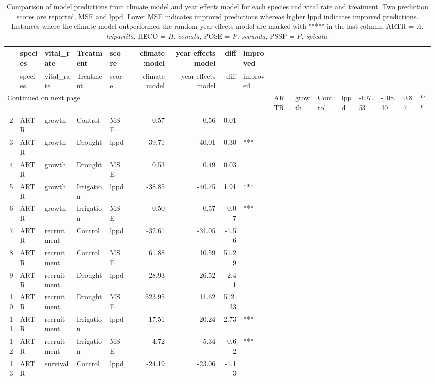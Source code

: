 \begin{longtable}{rllllrrrl}
\caption{Comparison of model predictions from climate model and year effects model for each species and vital rate and treatment.  Two prediction scores are reported, MSE and lppd. Lower MSE indicates improved predictions whereas higher lppd indicates improved predictions.  Instances where the climate model outperformed the random year effects model are marked with "***" in the last column. ARTR = \textit{A. tripartita}, HECO = \textit{H. comata}, POSE = \textit{P. secunda}, PSSP = \textit{P. spicata}.} \\ 
  \hline
 & species & vital\_rate & Treatment & score & climate model & year effects model & diff & improved \\ 
  \hline
\endfirsthead
  \hline
& species & vital\_rate & Treatment & score & climate model & year effects model & diff & improved \\ 
\hline
\endhead
\hline
\multicolumn{9}{l}{\footnotesize Continued on next page}
\endfoot
\endlastfoot
1 & ARTR & growth & Control & lppd & -107.53 & -108.40 & 0.87 & *** \\ 
  2 & ARTR & growth & Control & MSE & 0.57 & 0.56 & 0.01 &  \\ 
  3 & ARTR & growth & Drought & lppd & -39.71 & -40.01 & 0.30 & *** \\ 
  4 & ARTR & growth & Drought & MSE & 0.53 & 0.49 & 0.03 &  \\ 
  5 & ARTR & growth & Irrigation & lppd & -38.85 & -40.75 & 1.91 & *** \\ 
  6 & ARTR & growth & Irrigation & MSE & 0.50 & 0.57 & -0.07 & *** \\ 
  7 & ARTR & recruitment & Control & lppd & -32.61 & -31.05 & -1.56 &  \\ 
  8 & ARTR & recruitment & Control & MSE & 61.88 & 10.59 & 51.29 &  \\ 
  9 & ARTR & recruitment & Drought & lppd & -28.93 & -26.52 & -2.41 &  \\ 
  10 & ARTR & recruitment & Drought & MSE & 523.95 & 11.62 & 512.33 &  \\ 
  11 & ARTR & recruitment & Irrigation & lppd & -17.51 & -20.24 & 2.73 & *** \\ 
  12 & ARTR & recruitment & Irrigation & MSE & 4.72 & 5.34 & -0.62 & *** \\ 
  13 & ARTR & survival & Control & lppd & -24.19 & -23.06 & -1.13 &  \\ 

\end{longtable}
